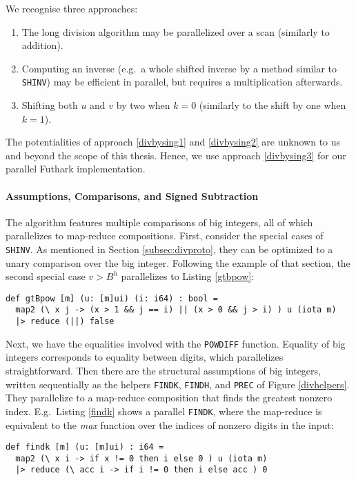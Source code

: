 We recognise three approaches:
\begin{enumerate}
\item The long division algorithm may be parallelized over a scan (similarly to
  addition).\label{divbysing1}
\item Computing an inverse (e.g.\ a whole shifted inverse by a method similar to
  \texttt{SHINV}) may be efficient in parallel, but requires a multiplication
  afterwards.\label{divbysing2}
\item Shifting both $u$ and $v$ by two when $k = 0$ (similarly to the shift by
  one when $k=1$).\label{divbysing3}
\end{enumerate}

The potentialities of approach \ref{divbysing1} and \ref{divbysing2} are unknown
to us and beyond the scope of this thesis. Hence, we use approach
\ref{divbysing3} for our parallel Futhark implementation.

\paragraph{Assumptions, Comparisons, and Signed Subtraction}
The algorithm features multiple comparisons of big integers, all of which
parallelizes to map-reduce compositions. First, consider the special cases of
\texttt{SHINV}. As mentioned in Section \ref{subsec:divproto}, they can be
optimized to a unary comparison over the big integer. Following the example of
that section, the second special case $v > B^h$ parallelizes to Listing
\ref{gtbpow}:
\begin{lstlisting}[language=futhark,caption={\footnotesize Futhark function to check $u > B^i$ in parallel for big integer $u$ in base $B$ from file \texttt{div.fut}.},label={gtbpow},firstnumber=29]
def gtBpow [m] (u: [m]ui) (i: i64) : bool =
  map2 (\ x j -> (x > 1 && j == i) || (x > 0 && j > i) ) u (iota m)
  |> reduce (||) false
\end{lstlisting}
Next, we have the equalities involved with the \texttt{POWDIFF}
function. Equality of big integers corresponds to equality between digits, which
parallelizes straightforward. Then there are the structural assumptions of big
integers, written sequentially as the helpers \texttt{FINDK}, \texttt{FINDH},
and \texttt{PREC} of Figure \ref{divhelpers}. They parallelize to a map-reduce
composition that finds the greatest nonzero index. E.g.\ Listing \ref{findk}
shows a parallel \texttt{FINDK}, where the map-reduce is equivalent to the
\textit{max} function over the indices of nonzero digits in the input:
\begin{lstlisting}[language=futhark,caption={\footnotesize Futhark function to find $i$ for big integer $u$ in base $B$ s.t.\ $B^i \leq u < B^{i+1}$ from file \texttt{div.fut}.},label={findk},firstnumber=39]
def findk [m] (u: [m]ui) : i64 =
  map2 (\ x i -> if x != 0 then i else 0 ) u (iota m)
  |> reduce (\ acc i -> if i != 0 then i else acc ) 0
\end{lstlisting}

